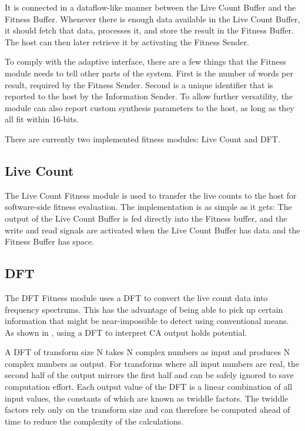 It is connected in a dataflow-like manner between the Live Count Buffer and the Fitness Buffer.
Whenever there is enough data available in the Live Count Buffer, it should fetch that data, processes it, and store the result in the Fitness Buffer.
The host can then later retrieve it by activating the Fitness Sender.

To comply with the adaptive interface, there are a few things that the Fitness module needs to tell other parts of the system.
First is the number of words per result, required by the Fitness Sender.
Second is a unique identifier that is reported to the host by the Information Sender.
To allow further versatility, the module can also report custom synthesis parameters to the host, as long as they all fit within 16-bits.

There are currently two implemented fitness modules: Live Count and DFT.

\subsection{Live Count}

The Live Count Fitness module is used to transfer the live counts to the host for software-side fitness evaluation.
The implementation is as simple as it gets:
The output of the Live Count Buffer is fed directly into the Fitness buffer, and the write and read signals are activated when the Live Count Buffer has data and the Fitness Buffer has space.

\subsection{DFT}

The DFT Fitness module uses a DFT to convert the live count data into frequency spectrums.
This has the advantage of being able to pick up certain information that might be near-impossible to detect using conventional means.
As shown in \cite{berg2013ca}, using a DFT to interpret CA output holds potential.

A DFT of transform size N takes N complex numbers as input and produces N complex numbers as output.
For transforms where all input numbers are real, the second half of the output mirrors the first half and can be safely ignored to save computation effort.
Each output value of the DFT is a linear combination of all input values, the constants of which are known as twiddle factors.
The twiddle factors rely only on the transform size and can therefore be computed ahead of time to reduce the complexity of the calculations.

